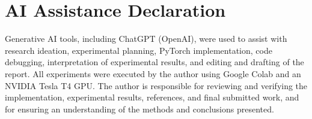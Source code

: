 \documentclass[10pt,a4paper]{article}
\begin{document}
\nocite{*}

\section*{AI Assistance Declaration}

Generative AI tools, including ChatGPT (OpenAI), were used
to assist with research ideation, experimental planning,
PyTorch implementation, code debugging, interpretation of
experimental results, and editing and drafting of the report.
All experiments were executed by the author using Google
Colab and an NVIDIA Tesla T4 GPU. The author is responsible
for reviewing and verifying the implementation, experimental
results, references, and final submitted work, and for ensuring
an understanding of the methods and conclusions presented.



\end{document}
